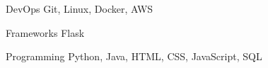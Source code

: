 

\begin{cvskills}


  \cvskill
    {DevOps} %
    {Git, Linux, Docker, AWS} %

  \cvskill
    {Frameworks} %
    {Flask} %

  \cvskill
    {Programming} %
    {Python, Java, HTML, CSS, JavaScript, SQL} %


\end{cvskills}
